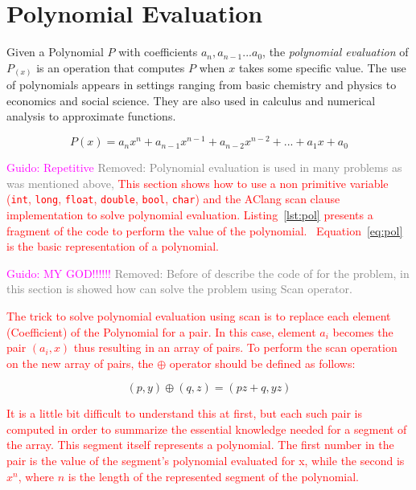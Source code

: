 \documentclass[Ingles]{ic-tese-v1}
\newcommand{\guido}[1]{\noindent\textcolor{magenta}{Guido: {#1}}}
\newcommand{\rem}[1]{\noindent\textcolor{gray}{Removed: {#1}}}
\newcommand{\ed}[1]{\noindent\textcolor{red}{ {#1}}}
\newcommand{\guido}[1]{}
\newcommand{\rem}[1]{}
\newcommand{\ed}[1]{}
\newcommand{\req}[1]{Equation~\ref{eq:#1}}
\newcommand{\ttt}[1]{{\texttt{#1}}}
\newcommand{\rlst}[1]{Listing~\ref{lst:#1}}
\begin{document}
\section{Polynomial Evaluation}
\label{sec:PolEval}

Given a Polynomial $P$ with coefficients $a_{n}, a_{n-1} ... a_{0}$, the \textit{polynomial evaluation} of $P_{(x)}$ is an operation
that computes $P$ when $x$ takes some specific value. The use of polynomials
appears in settings ranging from basic chemistry and physics to economics and social science.
They are also used in calculus and numerical analysis to approximate  functions.

\begin{equation}
P(x) = a_{n}x^n + a_{n-1}x^{n-1} + a_{n-2}x^{n-2} + ... + a_{1}x + a_{0}
\label{eq:pol}
\end{equation}

\guido{Repetitive} \rem{Polynomial evaluation is used in many problems as was mentioned above,}
\ed{This section shows how to use a non primitive variable (\ttt{int}, \ttt{long}, \ttt{float}, \ttt{double}, \ttt{bool}, \ttt{char})
and the AClang scan clause implementation to solve polynomial evaluation. \rlst{pol} presents
a fragment of the code to perform the value of the polynomial. ~\req{pol} is the basic
representation of a polynomial.}

\guido{MY GOD!!!!!!}
\rem{Before of describe the code of for the problem, in this section is
showed how can solve the problem using Scan operator.}

\ed{The trick to solve polynomial evaluation using scan is to replace each element (Coefficient) of the Polynomial for a pair. In this case,  
element $a_{i}$ becomes the pair $(a_{i}, x)$ thus resulting in an array of pairs. To perform the scan operation on the new array of pairs, 
the $\oplus$ operator should be defined  as follows:}

\begin{equation}
(p, y) \oplus (q, z) = (p z + q, y z)
\label{eq:opepol}
\end{equation}

\ed{It is a little  bit difficult to understand this at first, but
each such pair is computed in order to summarize the essential knowledge needed for a
segment of the array. This segment itself represents a polynomial. The first
number in the pair is the value of the segment's polynomial evaluated for x,
while the second is $x^{n}$, where $n$ is the length of the represented segment
of the polynomial.}
\end{document}
